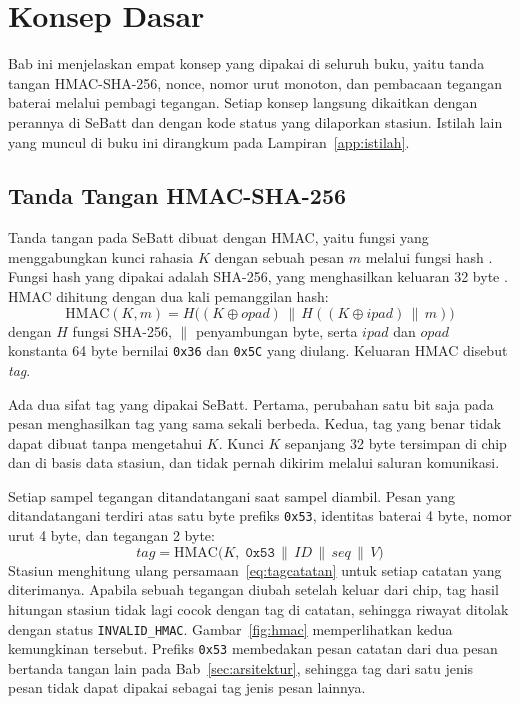 \documentclass[11pt,a4paper]{article}
\begin{document}
\section{Konsep Dasar}
\label{sec:konsep}

Bab ini menjelaskan empat konsep yang dipakai di seluruh buku, yaitu tanda tangan HMAC-SHA-256,
nonce, nomor urut monoton, dan pembacaan tegangan baterai melalui pembagi tegangan. Setiap
konsep langsung dikaitkan dengan perannya di SeBatt dan dengan kode status yang dilaporkan
stasiun. Istilah lain yang muncul di buku ini dirangkum pada Lampiran~\ref{app:istilah}.

\subsection{Tanda Tangan HMAC-SHA-256}
\label{subsec:hmac}

Tanda tangan pada SeBatt dibuat dengan HMAC, yaitu fungsi yang menggabungkan kunci rahasia $K$
dengan sebuah pesan $m$ melalui fungsi hash \cite{rfc2104}. Fungsi hash yang dipakai adalah
SHA-256, yang menghasilkan keluaran 32 byte \cite{fips180}. HMAC dihitung dengan dua kali
pemanggilan hash:
\begin{equation}
  \mathrm{HMAC}(K, m) = H\big((K \oplus \mathit{opad}) \,\|\, H((K \oplus \mathit{ipad}) \,\|\, m)\big)
  \label{eq:hmac}
\end{equation}
dengan $H$ fungsi SHA-256, $\|$ penyambungan byte, serta $\mathit{ipad}$ dan $\mathit{opad}$
konstanta 64 byte bernilai \texttt{0x36} dan \texttt{0x5C} yang diulang. Keluaran HMAC disebut
\textit{tag}.

Ada dua sifat tag yang dipakai SeBatt. Pertama, perubahan satu bit saja pada pesan menghasilkan
tag yang sama sekali berbeda. Kedua, tag yang benar tidak dapat dibuat tanpa mengetahui $K$.
Kunci $K$ sepanjang 32 byte tersimpan di chip dan di basis data stasiun, dan tidak pernah
dikirim melalui saluran komunikasi.

Setiap sampel tegangan ditandatangani saat sampel diambil. Pesan yang ditandatangani terdiri
atas satu byte prefiks \texttt{0x53}, identitas baterai 4 byte, nomor urut 4 byte, dan tegangan
2 byte:
\begin{equation}
  \mathit{tag} = \mathrm{HMAC}\big(K,\; \texttt{0x53} \,\|\, \mathit{ID} \,\|\, \mathit{seq}
    \,\|\, V\big)
  \label{eq:tagcatatan}
\end{equation}
Stasiun menghitung ulang persamaan~\eqref{eq:tagcatatan} untuk setiap catatan yang diterimanya.
Apabila sebuah tegangan diubah setelah keluar dari chip, tag hasil hitungan stasiun tidak lagi
cocok dengan tag di catatan, sehingga riwayat ditolak dengan status \texttt{INVALID\_HMAC}.
Gambar~\ref{fig:hmac} memperlihatkan kedua kemungkinan tersebut. Prefiks \texttt{0x53} membedakan
pesan catatan dari dua pesan bertanda tangan lain pada Bab~\ref{sec:arsitektur}, sehingga tag
dari satu jenis pesan tidak dapat dipakai sebagai tag jenis pesan lainnya.
\end{document}
